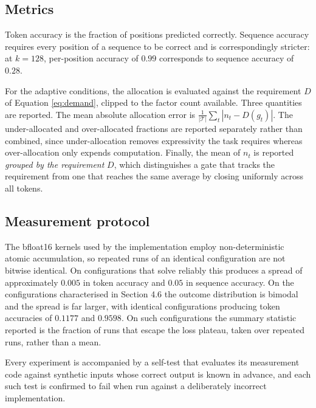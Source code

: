 \subsection{Metrics}

Token accuracy is the fraction of positions predicted correctly. Sequence
accuracy requires every position of a sequence to be correct and is
correspondingly stricter: at $k = 128$, per-position accuracy of $0.99$
corresponds to sequence accuracy of $0.28$.

For the adaptive conditions, the allocation is evaluated against the requirement
$D$ of Equation \ref{eq:demand}, clipped to the factor count available. Three
quantities are reported. The mean absolute allocation error is
$\frac{1}{|\mathcal{T}|}\sum_t |n_t - D(g_t)|$. The under-allocated and
over-allocated fractions are reported separately rather than combined, since
under-allocation removes expressivity the task requires whereas over-allocation
only expends computation. Finally, the mean of $n_t$ is reported \emph{grouped by
the requirement} $D$, which distinguishes a gate that tracks the requirement from
one that reaches the same average by closing uniformly across all tokens.

\subsection{Measurement protocol}

The bfloat16 kernels used by the implementation employ non-deterministic atomic
accumulation, so repeated runs of an identical configuration are not bitwise
identical. On configurations that solve reliably this produces a spread of
approximately $0.005$ in token accuracy and $0.05$ in sequence accuracy. On the
configurations characterised in Section 4.6 the outcome distribution is bimodal
and the spread is far larger, with identical configurations producing token
accuracies of $0.1177$ and $0.9598$. On such configurations the summary statistic
reported is the fraction of runs that escape the loss plateau, taken over
repeated runs, rather than a mean.

Every experiment is accompanied by a self-test that evaluates its measurement
code against synthetic inputs whose correct output is known in advance, and each
such test is confirmed to fail when run against a deliberately incorrect
implementation.
\null
